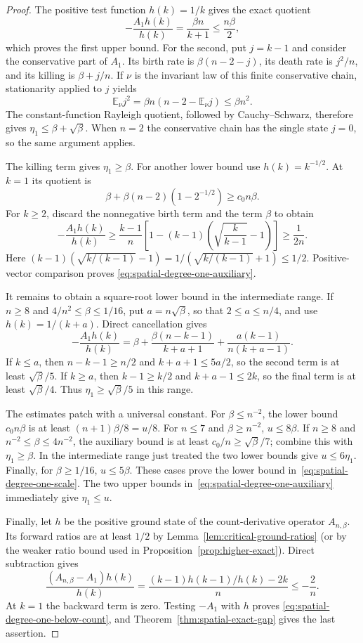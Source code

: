 \begin{proof}
The positive test function $h(k)=1/k$ gives the exact quotient
\[
 -\frac{A_1h(k)}{h(k)}=\frac{\beta n}{k+1}\leq\frac{n\beta}{2},
\]
which proves the first upper bound.  For the second, put $j=k-1$ and
consider the conservative part of $A_1$.  Its birth rate is
$\beta(n-2-j)$, its death rate is $j^2/n$, and its killing is
$\beta+j/n$.  If $\nu$ is the invariant law of this finite
conservative chain, stationarity applied to $j$ yields
\[
 \mathbb E_\nu j^2
 =\beta n(n-2-\mathbb E_\nu j)\leq\beta n^2.
\]
The constant-function Rayleigh quotient, followed by Cauchy--Schwarz,
therefore gives $\eta_1\leq\beta+\sqrt\beta$.  When $n=2$ the
conservative chain has the single state $j=0$, so the same argument
applies.

The killing term gives $\eta_1\geq\beta$.  For another lower bound
use $h(k)=k^{-1/2}$.  At $k=1$ its quotient is
\[
 \beta+\beta(n-2)(1-2^{-1/2})\geq c_0n\beta.
\]
For $k\geq2$, discard the nonnegative birth term and the term $\beta$
to obtain
\[
 -\frac{A_1h(k)}{h(k)}
 \geq\frac{k-1}{n}
 \left[1-(k-1)\left(\sqrt{\frac{k}{k-1}}-1\right)\right]
 \geq\frac1{2n}.
\]
Here
$(k-1)(\sqrt{k/(k-1)}-1)=1/(\sqrt{k/(k-1)}+1)\leq1/2$.
Positive-vector comparison proves
\eqref{eq:spatial-degree-one-auxiliary}.

It remains to obtain a square-root lower bound in the intermediate
range.  If $n\geq8$ and $4/n^2\leq\beta\leq1/16$, put
$a=n\sqrt\beta$, so that $2\leq a\leq n/4$, and use
$h(k)=1/(k+a)$.  Direct cancellation gives
\begin{equation}\label{eq:spatial-reciprocal-quotient}
 -\frac{A_1h(k)}{h(k)}
 =\beta+\frac{\beta(n-k-1)}{k+a+1}
       +\frac{a(k-1)}{n(k+a-1)}.
\end{equation}
If $k\leq a$, then $n-k-1\geq n/2$ and $k+a+1\leq5a/2$,
so the second term is at least $\sqrt\beta/5$.  If $k\geq a$,
then $k-1\geq k/2$ and $k+a-1\leq2k$, so the final term is at
least $\sqrt\beta/4$.  Thus $\eta_1\geq\sqrt\beta/5$ in this
range.

The estimates patch with a universal constant.  For
$\beta\leq n^{-2}$, the lower bound $c_0n\beta$ is at least
$(n+1)\beta/8=u/8$.  For $n\leq7$ and $\beta\geq n^{-2}$,
$u\leq8\beta$.  If $n\geq8$ and
$n^{-2}\leq\beta\leq4n^{-2}$, the auxiliary bound is at least
$c_0/n\geq\sqrt\beta/7$; combine this with $\eta_1\geq\beta$.
In the intermediate range just treated the two lower bounds give
$u\leq6\eta_1$.  Finally, for $\beta\geq1/16$, $u\leq5\beta$.
These cases prove the lower bound in~\eqref{eq:spatial-degree-one-scale}.
The two upper bounds in~\eqref{eq:spatial-degree-one-auxiliary}
immediately give $\eta_1\leq u$.

Finally, let $h$ be the positive ground state of the count-derivative
operator $A_{n,\beta}$.  Its forward ratios are at least $1/2$ by
Lemma~\ref{lem:critical-ground-ratios} (or by the weaker ratio bound
used in Proposition~\ref{prop:higher-exact}).  Direct subtraction gives
\[
 \frac{(A_{n,\beta}-A_1)h(k)}{h(k)}
 =\frac{(k-1)h(k-1)/h(k)-2k}{n}\leq-\frac2n.
\]
At $k=1$ the backward term is zero.  Testing $-A_1$ with $h$ proves
\eqref{eq:spatial-degree-one-below-count}, and
Theorem~\ref{thm:spatial-exact-gap} gives the last assertion.
\end{proof}

